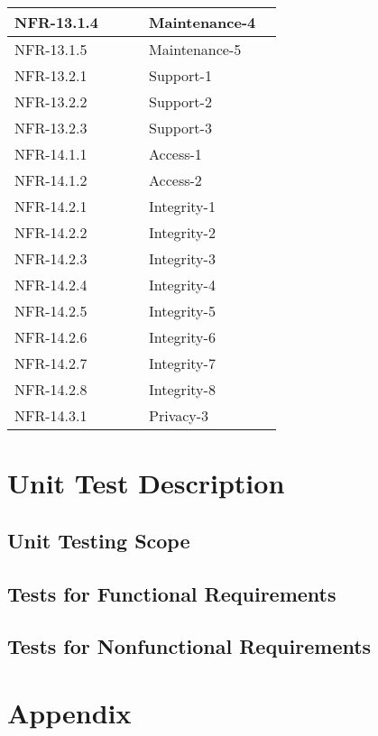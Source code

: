 \documentclass[12pt, titlepage]{article}
\begin{document}
\begin{longtable}{|p{0.45\linewidth}|p{0.45\linewidth}|}
\hline
NFR-13.1.4 & Maintenance-4 \\
\hline
NFR-13.1.5 & Maintenance-5 \\
\hline
NFR-13.2.1 & Support-1 \\
\hline
NFR-13.2.2 & Support-2 \\
\hline
NFR-13.2.3 & Support-3 \\
\hline
NFR-14.1.1 & Access-1 \\
\hline
NFR-14.1.2 & Access-2 \\
\hline
NFR-14.2.1 & Integrity-1 \\
\hline
NFR-14.2.2 & Integrity-2 \\
\hline
NFR-14.2.3 & Integrity-3 \\
\hline
NFR-14.2.4 & Integrity-4 \\
\hline
NFR-14.2.5 & Integrity-5 \\
\hline
NFR-14.2.6 & Integrity-6 \\
\hline
NFR-14.2.7 & Integrity-7 \\
\hline
NFR-14.2.8 & Integrity-8 \\
\hline
NFR-14.3.1 & Privacy-3 \\
\hline
\end{longtable}


\section{Unit Test Description}

\subsection{Unit Testing Scope}

\subsection{Tests for Functional Requirements}

\subsection{Tests for Nonfunctional Requirements}





\newpage

\section{Appendix}
\end{document}
